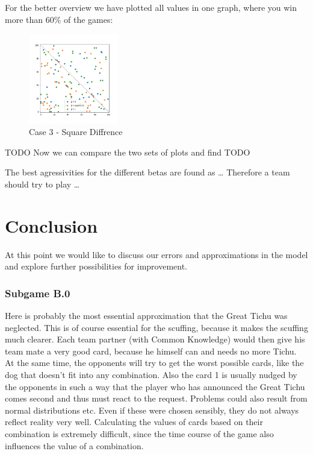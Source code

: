 For the better overview we have plotted all values in one graph, where you win  more than 60$\%$ of the games:

\begin{figure}[!ht]
    \centering
    \includegraphics[width=0.35\textwidth]{Bilder/simulation_16}
    \caption{Case 3 - Square Diffrence}
    \label{fig:meine-grafik}
\end{figure}


TODO
Now we can compare the two sets of plots and find TODO

The best agressivities for the different betas are found as … Therefore a team should try to play …



\section{Conclusion}
At this point we would like to discuss our errors and approximations in the model and explore further possibilities for improvement.

\subsubsection{Subgame B.0}

Here is probably the most essential approximation that the Great Tichu was neglected. This is of course essential for the scuffing, because it makes the scuffing much clearer. Each team partner (with Common Knowledge) would then give his team mate a very good card, because he himself can and needs no more Tichu. At the same time, the opponents will try to get the worst possible cards, like the dog that doesn't fit into any combination. Also the card 1 is usually nudged by the opponents in such a way that the player who has announced the Great Tichu comes second and thus must react to the request.
Problems could also result from normal distributions etc. Even if these were chosen sensibly, they do not always reflect reality very well. Calculating the values of cards based on their combination is extremely difficult, since the time course of the game also influences the value of a combination.

